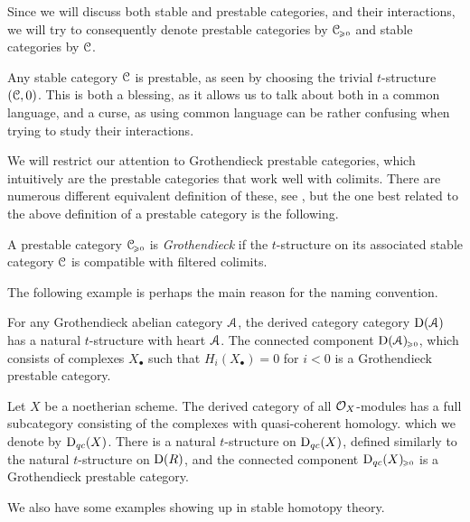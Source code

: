 Since we will discuss both stable and prestable categories, and their interactions, we will try to consequently denote prestable categories by $\EuScript{C}_{\hspace{-1pt}\scriptscriptstyle\geqslant 0}$ and stable categories by $\EuScript{C}$. 

\begin{remark}
    \label{ch3:rm:stable-is-prestable}
    Any stable category $\EuScript{C}$ is prestable, as seen by choosing the trivial $t$-structure $(\EuScript{C},0)$. This is both a blessing, as it allows us to talk about both in a common language, and a curse, as using common language can be rather confusing when trying to study their interactions.
\end{remark}

We will restrict our attention to Grothendieck prestable categories, which intuitively are the prestable categories that work well with colimits. There are numerous different equivalent definition of these, see \cite[C.1.4.1]{lurie_SAG}, but the one best related to the above definition of a prestable category is the following. 

\begin{definition}
    A prestable category $\EuScript{C}_{\hspace{-1pt}\scriptscriptstyle\geqslant 0}$ is \emph{Grothendieck} if the $t$-structure on its associated stable category $\EuScript{C}$ is compatible with filtered colimits. 
\end{definition}

The following example is perhaps the main reason for the naming convention.

\begin{example}
    For any Grothendieck abelian category $\EuScript{A}$, the derived category category $\mathrm{D}(\EuScript{A})$ has a natural $t$-structure with heart $\EuScript{A}$. The connected component $\mathrm{D}(\EuScript{A})_{\hspace{-1pt}\scriptscriptstyle\geqslant 0}$, which consists of complexes $X_\bullet$ such that $H_i(X_\bullet) = 0$ for $i<0$ is a Grothendieck prestable category.  
\end{example}

\begin{example}
    Let $X$ be a noetherian scheme. The derived category of all $\mathcal{O}_X$-modules has a full subcategory consisting of the complexes with quasi-coherent homology. which we denote by $\mathrm{D}_{qc}(X)$. There is a natural $t$-structure on $\mathrm{D}_{qc}(X)$, defined similarly to the natural $t$-structure on $\mathrm{D}(R)$, and the connected component $\mathrm{D}_{qc}(X)_{\hspace{-1pt}\scriptscriptstyle\geqslant 0}$ is a Grothendieck prestable category. 
\end{example}

We also have some examples showing up in stable homotopy theory. 

